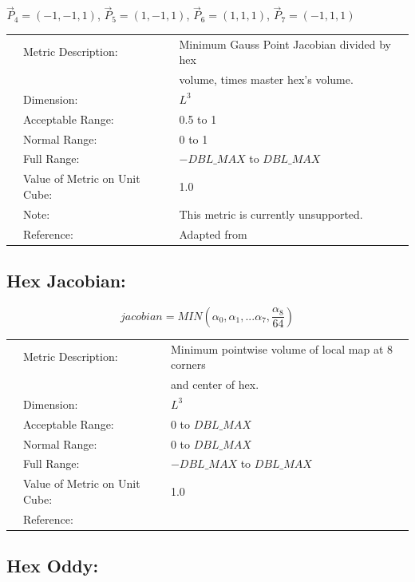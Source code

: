 \documentclass[12pt]{article}
\def\beq{\begin{equation}}
\def\eeq{\end{equation}}
\begin{document}
 $\vec P_4 = (-1, -1, 1)$,  
 $\vec P_5 = (1, -1, 1)$,
 $\vec P_6 = (1, 1, 1)$, 
 $\vec P_7 = (-1, 1, 1)$   \newline

\begin{tabular}{lll}
& Metric Description:  & Minimum Gauss Point Jacobian divided by hex \\
&                      & volume, times master hex's volume. \\ 
& Dimension:           & $L^3$       \\ 
& Acceptable Range:    & 0.5 to 1 \\ 
& Normal Range:        & 0 to 1 \\ 
& Full Range:          & $-DBL\_MAX$ to $DBL\_MAX$ \\ 
& Value of Metric on Unit Cube:    & 1.0 \\
& Note:                & This metric is currently unsupported. \\ 
& Reference:           & Adapted from \cite{five} \\
\end{tabular} 

\subsection*{Hex Jacobian:}

\beq
jacobian = MIN\left( \alpha_0, \alpha_1, ...\alpha_7, \frac{\alpha_8} {64} \right)
\eeq

\begin{tabular}{lll}
& Metric Description:  & Minimum pointwise volume of local map at 8 corners \\ 
&                      & and center of hex. \\
& Dimension:           & $L^3$       \\ 
& Acceptable Range:    & 0 to $DBL\_MAX$ \\ 
& Normal Range:        & 0 to $DBL\_MAX$ \\ 
& Full Range:          & $-DBL\_MAX$ to $DBL\_MAX$ \\ 
& Value of Metric on Unit Cube:    & 1.0 \\
& Reference:           & \cite{three} \\
\end{tabular} 


\subsection*{Hex Oddy:}
\end{document}
